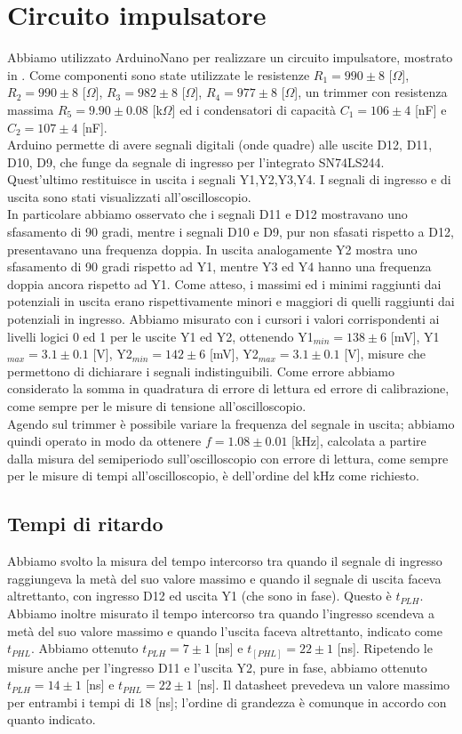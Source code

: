 \section{Circuito impulsatore}
Abbiamo utilizzato ArduinoNano per realizzare un circuito impulsatore, mostrato in . Come componenti sono state utilizzate le resistenze $R_1 = 990 \pm 8$ [$\Omega$], $R_2 = 990 \pm 8$ [$\Omega$], $R_3 = 982 \pm 8$ [$\Omega$], $R_4 = 977 \pm 8$ [$\Omega$], un trimmer con resistenza massima $R_5 = 9.90 \pm 0.08$ [k$\Omega$] ed i condensatori di capacità $C_1 = 106 \pm 4$ [nF] e $C_2 = 107 \pm 4$ [nF].\\
Arduino permette di avere segnali digitali (onde quadre) alle uscite D12, D11, D10, D9, che funge da segnale di ingresso per l'integrato SN74LS244. Quest'ultimo restituisce in uscita i segnali Y1,Y2,Y3,Y4. I segnali di ingresso e di uscita sono stati visualizzati all'oscilloscopio.\\
In particolare abbiamo osservato che i segnali D11 e D12 mostravano uno sfasamento di 90 gradi, mentre i segnali D10 e D9, pur non sfasati rispetto a D12, presentavano una frequenza doppia. In uscita analogamente Y2 mostra uno sfasamento di 90 gradi rispetto ad Y1, mentre Y3 ed Y4 hanno una frequenza doppia ancora rispetto ad Y1. Come atteso, i massimi ed i minimi raggiunti dai potenziali in uscita erano rispettivamente minori e maggiori di quelli raggiunti dai potenziali in ingresso. Abbiamo misurato con i cursori i valori corrispondenti ai livelli logici 0 ed 1 per le uscite Y1 ed Y2, ottenendo Y1$_{min} = 138 \pm 6$ [mV], Y1$_{max} = 3.1 \pm 0.1$ [V], Y2$_{min} = 142 \pm 6$ [mV], Y2$_{max} = 3.1 \pm 0.1$ [V], misure che permettono di dichiarare i segnali indistinguibili. Come errore abbiamo considerato la somma in quadratura di errore di lettura ed errore di calibrazione, come sempre per le misure di tensione all'oscilloscopio.\\
Agendo sul trimmer è possibile variare la frequenza del segnale in uscita; abbiamo quindi operato in modo da ottenere $f = 1.08 \pm 0.01$ [kHz], calcolata a partire dalla misura del semiperiodo sull'oscilloscopio con errore di lettura, come sempre per le misure di tempi all'oscilloscopio, è dell'ordine del kHz come richiesto.
\subsection{Tempi di ritardo}
Abbiamo svolto la misura del tempo intercorso tra quando il segnale di ingresso raggiungeva la metà del suo valore massimo e quando il segnale di uscita faceva altrettanto, con ingresso D12 ed uscita Y1 (che sono in fase). Questo è $t_{PLH}$. Abbiamo inoltre misurato il tempo intercorso tra quando l'ingresso scendeva a metà del suo valore massimo e quando l'uscita faceva altrettanto, indicato come $t_{PHL}$. Abbiamo ottenuto $t_{PLH} = 7 \pm 1$ [ns] e $t_[PHL] = 22 \pm 1$ [ns]. Ripetendo le misure anche per l'ingresso D11 e l'uscita Y2, pure in fase, abbiamo ottenuto $t_{PLH} = 14 \pm 1$ [ns] e $t_{PHL} = 22 \pm 1$ [ns]. Il datasheet prevedeva un valore massimo per entrambi i tempi di 18 [ns]; l'ordine di grandezza è comunque in accordo con quanto indicato.
